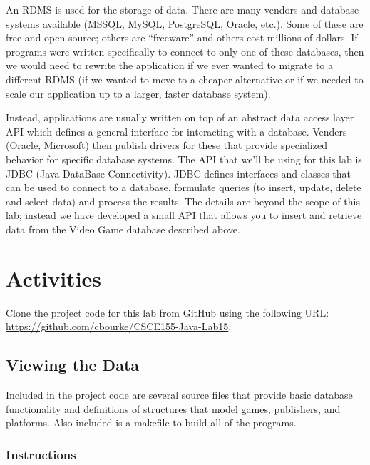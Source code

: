 \documentclass[12pt]{scrartcl}
\begin{document}
An RDMS is used for the storage of data.  There are many vendors 
and database systems available (MSSQL, MySQL, PostgreSQL, 
Oracle, etc.).  Some of these are free and open source; others are 
``freeware'' and others cost millions of dollars.  If programs were 
written specifically to connect to only one of these databases, then 
we would need to rewrite the application if we ever wanted to 
migrate to a different RDMS (if we wanted to move to a cheaper 
alternative or if we needed to scale our application up to a larger, 
faster database system).  

Instead, applications are usually written on top of an abstract data 
access layer API which defines a general interface for interacting 
with a database.  Venders (Oracle, Microsoft) then publish drivers 
for these that provide specialized behavior for specific database 
systems.  The API that we'll be using for this lab is JDBC (Java 
DataBase Connectivity).  JDBC defines interfaces and classes
that can be used to connect to a database, formulate queries (to 
insert, update, delete and select data) and process the results.  
The details are beyond the scope of this lab; instead we 
have developed a small API that allows you to insert and retrieve 
data from the Video Game database described above.  

\section{Activities}

Clone the project code for this lab from GitHub using the following
URL: \url{https://github.com/cbourke/CSCE155-Java-Lab15}.

\subsection{Viewing the Data}

Included in the project code are several source files that provide basic 
database functionality and definitions of structures that model games, 
publishers, and platforms.  Also included is a makefile to build all of the 
programs. 

\subsubsection*{Instructions}
\end{document}
